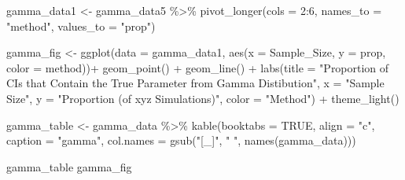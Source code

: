 \documentclass[12pt]{article}
\newenvironment{Shaded}{\begin{snugshade}}{\end{snugshade}}
\newcommand{\AttributeTok}[1]{\textcolor[rgb]{0.77,0.63,0.00}{#1}}
\newcommand{\ConstantTok}[1]{\textcolor[rgb]{0.00,0.00,0.00}{#1}}
\newcommand{\DecValTok}[1]{\textcolor[rgb]{0.00,0.00,0.81}{#1}}
\newcommand{\FunctionTok}[1]{\textcolor[rgb]{0.00,0.00,0.00}{#1}}
\newcommand{\NormalTok}[1]{#1}
\newcommand{\OtherTok}[1]{\textcolor[rgb]{0.56,0.35,0.01}{#1}}
\newcommand{\SpecialCharTok}[1]{\textcolor[rgb]{0.00,0.00,0.00}{#1}}
\newcommand{\StringTok}[1]{\textcolor[rgb]{0.31,0.60,0.02}{#1}}
\begin{document}
\begin{Shaded}
\begin{Highlighting}[]
\NormalTok{    gamma\_data1 }\OtherTok{\textless{}{-}}\NormalTok{ gamma\_data5 }\SpecialCharTok{\%\textgreater{}\%}
      \FunctionTok{pivot\_longer}\NormalTok{(}\AttributeTok{cols =} \DecValTok{2}\SpecialCharTok{:}\DecValTok{6}\NormalTok{, }\AttributeTok{names\_to =} \StringTok{"method"}\NormalTok{, }\AttributeTok{values\_to =} \StringTok{"prop"}\NormalTok{) }
    
\NormalTok{    gamma\_fig }\OtherTok{\textless{}{-}} \FunctionTok{ggplot}\NormalTok{(}\AttributeTok{data =}\NormalTok{ gamma\_data1, }\FunctionTok{aes}\NormalTok{(}\AttributeTok{x =}\NormalTok{ Sample\_Size, }\AttributeTok{y =}\NormalTok{ prop, }
                                                \AttributeTok{color =}\NormalTok{ method))}\SpecialCharTok{+}
      \FunctionTok{geom\_point}\NormalTok{() }\SpecialCharTok{+}
      \FunctionTok{geom\_line}\NormalTok{() }\SpecialCharTok{+} 
      \FunctionTok{labs}\NormalTok{(}\AttributeTok{title =} \StringTok{"Proportion of CIs that Contain the True Parameter }
\StringTok{           from Gamma Distibution"}\NormalTok{, }\AttributeTok{x =} \StringTok{"Sample Size"}\NormalTok{, }
           \AttributeTok{y =} \StringTok{"Proportion (of xyz Simulations)"}\NormalTok{, }\AttributeTok{color =} \StringTok{"Method"}\NormalTok{) }\SpecialCharTok{+}
      \FunctionTok{theme\_light}\NormalTok{()}
    
\NormalTok{    gamma\_table }\OtherTok{\textless{}{-}}\NormalTok{ gamma\_data }\SpecialCharTok{\%\textgreater{}\%}
      \FunctionTok{kable}\NormalTok{(}\AttributeTok{booktabs =} \ConstantTok{TRUE}\NormalTok{, }\AttributeTok{align =} \StringTok{"c"}\NormalTok{, }\AttributeTok{caption =} \StringTok{"gamma"}\NormalTok{, }
            \AttributeTok{col.names =} \FunctionTok{gsub}\NormalTok{(}\StringTok{"[\_]"}\NormalTok{, }\StringTok{" "}\NormalTok{, }\FunctionTok{names}\NormalTok{(gamma\_data)))}
    
\NormalTok{    gamma\_table}
\NormalTok{    gamma\_fig}
\end{Highlighting}
\end{Shaded}




\end{document}
